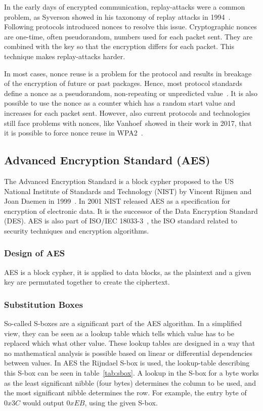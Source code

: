 In the early days of encrypted communication, replay-attacks were a common
problem, as Syverson showed in his taxonomy of replay attacks in
1994~\cite{replaytax}. Following protocols introduced nonces to resolve this
issue. Cryptographic nonces are one-time, often pseudorandom, numbers used for
each packet sent. They are combined with the key so that the encryption differs
for each packet. This technique makes replay-attacks harder.

In most cases, nonce reuse is a problem for the protocol and results in breakage
of the encryption of future or past packages. Hence, most protocol standards
define a nonce as a pseudorandom, non-repeating or unpredicted
value~\cite{noncegeneral}. It is also possible to use the nonce as a counter
which has a random start value and increases for each packet sent. However, also
current protocols and technologies still face problems with nonces, like
Vanhoef~\etal showed in their work in 2017, that it is possible to force nonce
reuse in WPA2~\cite{wpanoncereuse}.

\subsection{Advanced Encryption Standard (AES)}

The Advanced Encryption Standard is a block cypher proposed to the US National
Institute of Standards and Technology (NIST) by Vincent Rijmen and Joan Daemen
in 1999~\cite{aesproposal}. In 2001 NIST released AES as a specification for
encryption of electronic data. It is the successor of the Data Encryption
Standard (DES). AES is also part of ISO/IEC 18033-3~\cite{iso18033}, the ISO
standard related to security techniques and encryption algorithms.

\subsubsection{Design of AES}

AES is a block cypher, it is applied to data blocks, as the plaintext and a
given key are permutated together to create the ciphertext.

\subsubsection{Substitution Boxes}

So-called S-boxes are a significant part of the AES algorithm. In a simplified
view, they can be seen as a lookup table which tells which value has to be
replaced which what other value. These lookup tables are designed in a way that
no mathematical analysis is possible based on linear or differential
dependencies between values. In AES the Rijndael S-box is used, the
lookup-table describing this S-box can be seen in table~\ref{tab:sbox}. A
lookup in the S-box for a byte works as the least significant nibble (four
bytes) determines the column to be used, and the most significant nibble
determines the row. For example, the entry byte of $0x3C$ would output $0xEB$,
using the given S-box.


